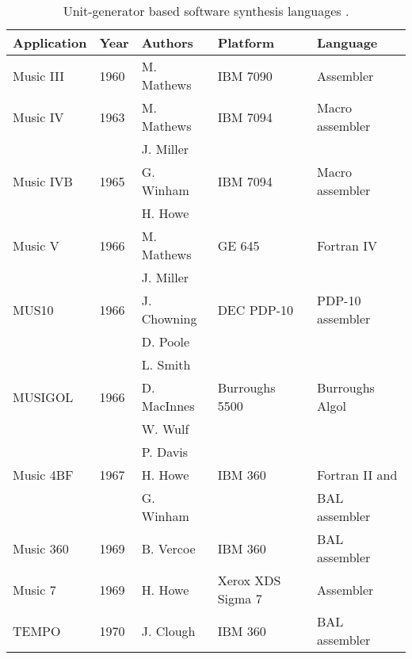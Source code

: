 
\chapter{}


\begin{table}[htbp]
	\label{tab:synthesis}
	\caption{Unit­-generator ­based software synthesis languages \cite[789-790]{Roads1995}.}
	\centering
	\vspace{12pt}
	\begin{tabular}{ *{5}{l} }
		\hline
		Application & Year & Authors & Platform & Language \\
		\hline
		Music III & 1960 & M. Mathews & IBM 7090 & Assembler \\
		Music IV & 1963 & M. Mathews & IBM 7094 & Macro assembler \\
		& & J. Miller & & \\
		Music IVB & 1965 & G. Winham & IBM 7094 & Macro assembler \\
		& & H. Howe & & \\
		Music V & 1966 & M. Mathews & GE 645 & Fortran IV \\
		& & J. Miller & & \\
		MUS10 & 1966 & J. Chowning & DEC PDP­-10 & PDP­-10 assembler \\
		& & D. Poole & & \\
		& & L. Smith & & \\
		MUSIGOL & 1966 & D. MacInnes & Burroughs 5500 & Burroughs Algol \\
		& & W. Wulf & & \\
		& & P. Davis & & \\
		Music 4BF & 1967 & H. Howe & IBM 360 & Fortran II and \\
		& & G. Winham & & BAL assembler \\
		Music 360 & 1969 & B. Vercoe & IBM 360 & BAL assembler \\
		Music 7 & 1969 & H. Howe & Xerox XDS Sigma 7 & Assembler \\
		TEMPO & 1970 & J. Clough & IBM 360 & BAL assembler \\

\end{tabular}
\end{table}
